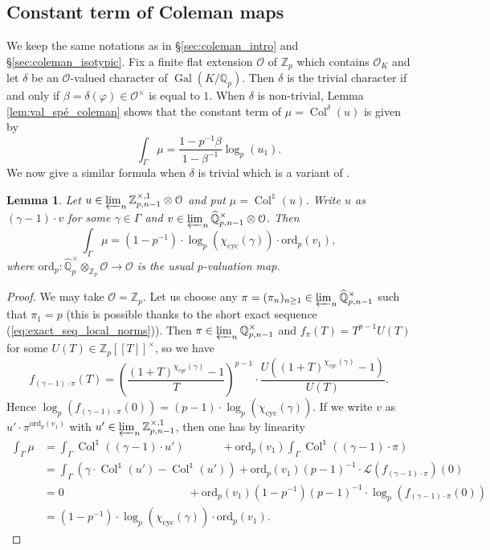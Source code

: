 \documentclass[12pt]{amsart}
\newcommand\bZ{\mathbb{Z}}
\newcommand\bQ{\mathbb{Q}}
\newcommand\Zp{{\mathbb{Z}_p}}
\newcommand\Qp{{\mathbb{Q}_p}}
\newcommand\cL{\mathcal{L}}
\newcommand\cO{\mathcal{O}}
\newcommand{\ord}{\mathrm{ord}}
\DeclareMathOperator{\Gal}{Gal}
\DeclareMathOperator{\cyc}{cyc}
\DeclareMathOperator{\Coleman}{Col}
\theoremstyle{defstyle}
\theoremstyle{thmstyle}
\newtheorem{lemme}[subsubsection]{Lemma}
\begin{document}
\subsection{Constant term of Coleman maps}\label{sec:coleman_cst_term}
We keep the same notations as in \S\ref{sec:coleman_intro} and \S\ref{sec:coleman_isotypic}. Fix a finite flat extension $\cO$ of $\Zp$ which contains $\cO_K$ and let $\delta$ be an $\cO$-valued character of $\Gal(K/\Qp)$. Then $\delta$ is the trivial character if and only if $\beta=\delta(\varphi)\in\cO^\times$ is equal to $1$. When $\delta$ is non-trivial, Lemma \ref{lem:val_spé_coleman} shows that the constant term of $\mu=\Coleman^\delta(u)$ is given by 
$$\int_{\Gamma}\mu = \frac{1-p^{-1}\beta}{1-\beta^{-1}}\log_p(u_1).$$
We now give a similar formula when $\delta$ is trivial which is a variant of  \cite[Prop. 1.3.7]{benois2014}. 
\begin{lemme}\label{lem:coleman_ord}
    Let $u\in \varprojlim_n \bZ^{\times,1}_{p,n-1}\otimes \cO$ and put $\mu=\Coleman^{\mathds{1}}(u)$. Write $u$ as $(\gamma-1)\cdot v$ for some $\gamma\in\Gamma$ and $v\in\varprojlim_n \widehat{\bQ}^\times_{p,n-1} \otimes \cO$. Then 
	\begin{equation}\label{eqn:terme_constant_coleman1}
	\int_{\Gamma} \mu = \left(1-p^{-1}\right)\cdot\log_p(\chi_{\cyc}(\gamma))\cdot\ord_p(v_1),
	\end{equation}
	where $\ord_p:\widehat{\bQ}^\times_p \otimes_{\Zp}\cO \longrightarrow \cO$ is the usual $p$-valuation map. 
\end{lemme}
\begin{proof}
 We may take $\cO=\Zp$. Let us choose any $\pi=(\pi_n)_{n\geq 1}\in \varprojlim_n \widehat{\bQ}^\times_{p,n-1}$ such that  $\pi_1=p$ (this is possible thanks to the short exact sequence (\ref{eq:exact_seq_local_norms})). Then $\pi\in \varprojlim_n \bQ^\times_{p,n-1}$ and $f_\pi(T)=T^{p-1}U(T)$ for some $U(T)\in \Zp[[T]]^\times$, so we have
	$$f_{(\gamma-1)\cdot\pi}(T)=\left(\frac{(1+T)^{\chi_{cyc}(\gamma)}-1}{T}\right)^{p-1}\cdot \frac{U((1+T)^{\chi_{cyc}(\gamma)}-1)}{U(T)}.$$
	Hence $\log_p(f_{(\gamma-1)\cdot\pi}(0))=(p-1)\cdot\log_p(\chi_{\cyc}(\gamma))$. If we write $v$ as $u' \cdot\pi^{\ord_p(v_1)}$ with $u'\in \varprojlim_n \bZ^{\times,1}_{p,n-1}$, then one has by linearity
	\[
	\begin{split}
	\int_{\Gamma}\mu &=\int_{\Gamma} \Coleman^{\mathds{1}}((\gamma-1)\cdot u') \quad\;\qquad+ \ord_p(v_1)\int_{\Gamma}\Coleman^{\mathds{1}}((\gamma-1)\cdot \pi)\\
	&= \int_{\Gamma} \left(\gamma\cdot \Coleman^{\mathds{1}}(u')-\Coleman^{\mathds{1}}(u')\right) + \ord_p(v_1)(p-1)^{-1}\cdot\cL(f_{(\gamma-1)\cdot \pi})(0)\\
	&= 0\qquad\qquad\qquad\qquad \qquad  \quad\!\!+ \ord_p(v_1)(1-p^{-1})(p-1)^{-1}\cdot\log_p(f_{(\gamma-1)\cdot\pi}(0))\\
	&= \left(1-p^{-1}\right)\cdot\log_p(\chi_{\cyc}(\gamma))\cdot\ord_p(v_1).  \end{split}\]\end{proof}
\end{document}
